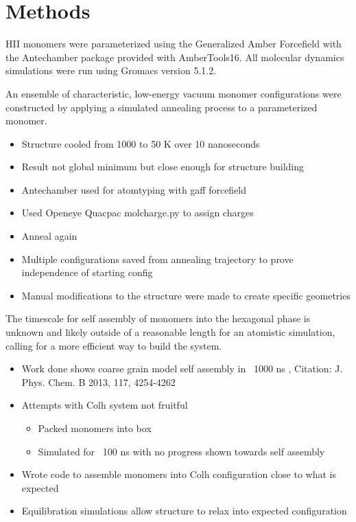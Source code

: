 \documentclass{article}
\begin{document}
	\section{Methods}
	
	HII monomers were parameterized using the Generalized Amber Forcefield with the Antechamber package provided with AmberTools16. All molecular dynamics simulations were run using Gromacs version 5.1.2.
	
	An ensemble of characteristic, low-energy vacuum monomer configurations were constructed by applying a simulated annealing process to a parameterized monomer.
	\begin{itemize}
		\item Structure cooled from 1000 to 50 K over 10 nanoseconds
		\item Result not global minimum but close enough for structure building
		\item Antechamber used for atomtyping with gaff forcefield
		\item Used Openeye Quacpac molcharge.py to assign charges
		\item Anneal again 
		\item Multiple configurations saved from annealing trajectory to prove independence of starting config
		\item Manual modifications to the structure were made to create specific geometries
	\end{itemize}
	
	The timescale for self assembly of monomers into the hexagonal phase is unknown and likely outside of a reasonable length for an atomistic simulation, calling for a more efficient way to build the system. 
	\begin{itemize}
		\item Work done shows coarse grain model self assembly in ~1000 ns , Citation: J. Phys. Chem. B 2013, 117, 4254-4262
		\item Attempts with Colh system not fruitful  
		\begin{itemize}
			\item Packed monomers into box
			\item Simulated for ~100 ns with no progress shown towards self assembly
		\end{itemize}  
		\item Wrote code to assemble monomers into Colh configuration close to what is expected 
		\item Equilibration simulations allow structure to relax into expected configuration 
	\end{itemize}
	
\end{document}
